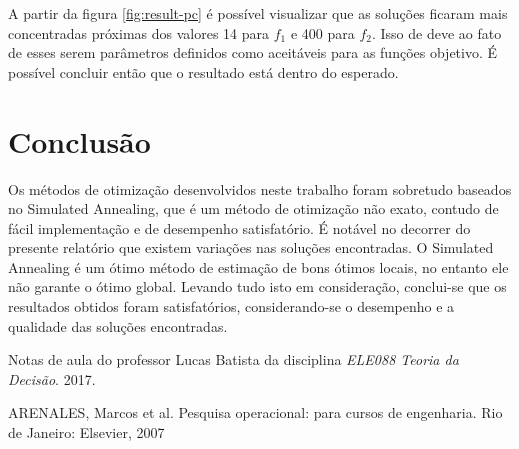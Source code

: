 \documentclass[conference]{IEEEtran}
\begin{document}
A partir da figura \ref{fig:result-pc} é possível visualizar que as soluções ficaram mais concentradas próximas dos valores 14 para $f_1$ e 400 para $f_2$. Isso de deve ao fato de esses serem parâmetros definidos como aceitáveis para as funções objetivo. É possível concluir então que o resultado está dentro do esperado.

\section{Conclusão}
Os métodos de otimização desenvolvidos neste trabalho foram sobretudo baseados no Simulated Annealing, que é um método de otimização não exato, contudo de fácil implementação e de desempenho satisfatório. É notável no decorrer do presente relatório que existem variações nas soluções encontradas. O Simulated Annealing é um ótimo método de estimação
de bons ótimos locais, no entanto ele não garante o ótimo global. Levando tudo isto em consideração, conclui-se que os resultados obtidos foram satisfatórios, considerando-se o desempenho e a qualidade das soluções encontradas.

\begin{thebibliography}{1}

Notas de aula do professor Lucas Batista da disciplina \emph{ELE088 Teoria da Decisão}. 2017.

ARENALES, Marcos et al. Pesquisa operacional: para cursos de engenharia. Rio de Janeiro: Elsevier, 2007

\end{thebibliography}


\end{document}

